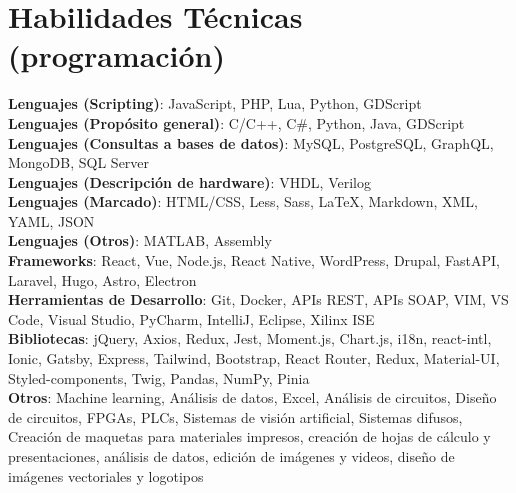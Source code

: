 \documentclass[letterpaper,11pt]{article}
\begin{document}
\section{Habilidades Técnicas (programación)}
\begin{itemize}[leftmargin=0.15in, label={}, itemsep=2pt, parsep=2pt]
  \small{\item{
    \textbf{Lenguajes (Scripting)}{: JavaScript, PHP, Lua, Python, GDScript} \\
    \textbf{Lenguajes (Propósito general)}{: C/C++, C\#, Python, Java, GDScript} \\
    \textbf{Lenguajes (Consultas a bases de datos)}{: MySQL, PostgreSQL, GraphQL, MongoDB, SQL Server} \\
    \textbf{Lenguajes (Descripción de hardware)}{: VHDL, Verilog} \\
    \textbf{Lenguajes (Marcado)}{: HTML/CSS, Less, Sass, LaTeX, Markdown, XML, YAML, JSON} \\
    \textbf{Lenguajes (Otros)}{: MATLAB, Assembly} \\
    \textbf{Frameworks}{: React, Vue, Node.js, React Native, WordPress, Drupal, FastAPI, Laravel, Hugo, Astro, Electron} \\
    \textbf{Herramientas de Desarrollo}{: Git, Docker, APIs REST, APIs SOAP, VIM, VS Code, Visual Studio, PyCharm, IntelliJ, Eclipse, Xilinx ISE} \\
    \textbf{Bibliotecas}{: jQuery, Axios, Redux, Jest, Moment.js, Chart.js, i18n, react-intl, Ionic, Gatsby, Express, Tailwind, Bootstrap, React Router, Redux, Material-UI, Styled-components, Twig, Pandas, NumPy, Pinia} \\
    \textbf{Otros}{: Machine learning, Análisis de datos, Excel, Análisis de circuitos, Diseño de circuitos, FPGAs, PLCs, Sistemas de visión artificial, Sistemas difusos, Creación de maquetas para materiales impresos, creación de hojas de cálculo y presentaciones, análisis de datos, edición de imágenes y videos, diseño de imágenes vectoriales y logotipos} \
  }}
\end{itemize}
\end{document}
